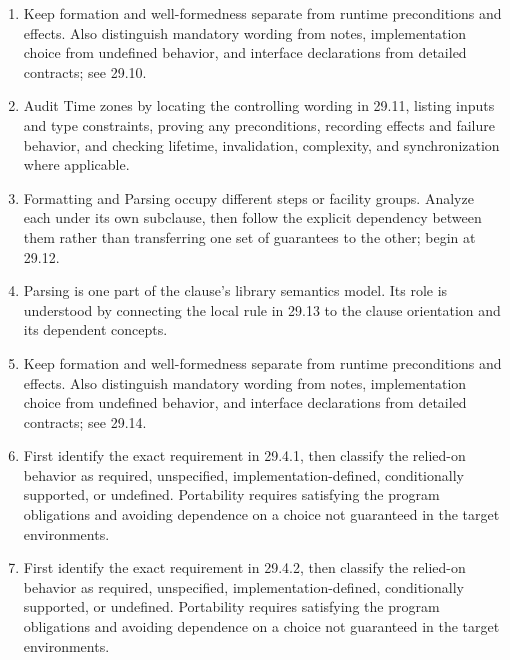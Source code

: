 \documentclass[11pt,letterpaper]{article}
\begin{document}
\begin{enumerate}
\item Keep formation and well-formedness separate from runtime preconditions and effects. Also distinguish mandatory wording from notes, implementation choice from undefined behavior, and interface declarations from detailed contracts; see 29.10.
\item Audit Time zones by locating the controlling wording in 29.11, listing inputs and type constraints, proving any preconditions, recording effects and failure behavior, and checking lifetime, invalidation, complexity, and synchronization where applicable.
\item Formatting and Parsing occupy different steps or facility groups. Analyze each under its own subclause, then follow the explicit dependency between them rather than transferring one set of guarantees to the other; begin at 29.12.
\item Parsing is one part of the clause's library semantics model. Its role is understood by connecting the local rule in 29.13 to the clause orientation and its dependent concepts.
\item Keep formation and well-formedness separate from runtime preconditions and effects. Also distinguish mandatory wording from notes, implementation choice from undefined behavior, and interface declarations from detailed contracts; see 29.14.
\item First identify the exact requirement in 29.4.1, then classify the relied-on behavior as required, unspecified, implementation-defined, conditionally supported, or undefined. Portability requires satisfying the program obligations and avoiding dependence on a choice not guaranteed in the target environments.
\item First identify the exact requirement in 29.4.2, then classify the relied-on behavior as required, unspecified, implementation-defined, conditionally supported, or undefined. Portability requires satisfying the program obligations and avoiding dependence on a choice not guaranteed in the target environments.
\end{enumerate}
\end{document}
